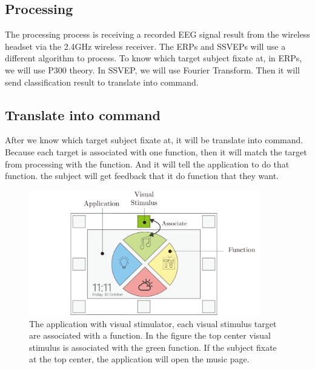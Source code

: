 \subsection{Processing}
\hspace{1.5cm}The processing process is receiving a recorded EEG signal result from the wireless headset via the 2.4GHz wireless receiver. The ERPs and SSVEPs will use a different algorithm to process. To know which target subject fixate at, in ERPs, we will use P300 theory. In SSVEP, we will use Fourier Transform. Then it will send classification result to translate into command.



\subsection{Translate into command}
\hspace{1.5cm} After we know which target subject fixate at, it will be translate into command. Because each target is associated with one function, then it will match the target from processing with the function. And it will tell the application to do that function. the subject will get feedback that it do function that they want.

\begin{figure}[ht]
	\centering
	\includegraphics[width=0.9\textwidth]{chapter5/associate.pdf}
	\caption{The application with visual stimulator, each visual stimulus target are associated with a function. In the figure the top center visual stimulus is associated with the green function. If the subject fixate at the top center, the application will open the music page. }
\end{figure}

\newpage
